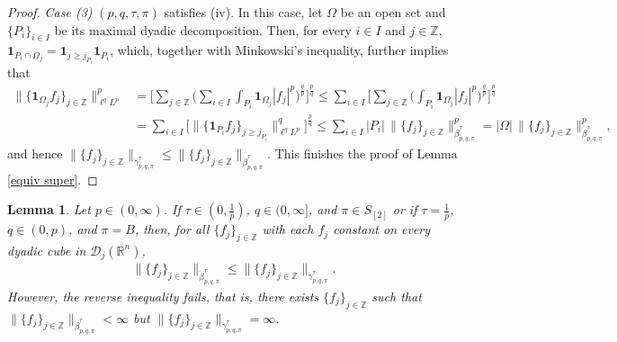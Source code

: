 \documentclass[11pt, reqno]{amsart}
\newtheorem{lemma}[theorem]{Lemma}
\theoremstyle{definition}
\theoremstyle{remark}
\numberwithin{equation}{section}
\newcommand{\R}{\mathbb R}
\newcommand{\Z}{\mathbb Z}
\newcommand{\one}{\mathbf{1}}
\begin{document}
\begin{proof}
\emph{Case (3)} $(p,q,\tau,\pi)$ satisfies (iv).
In this case, let $\Omega$ be an open set and
$\{P_i\}_{i\in I}$ be its maximal dyadic decomposition.
Then, for every $i\in I$ and $j\in\mathbb Z$,
$\mathbf 1_{P_i\cap \Omega_j} = \mathbf 1_{j\geq j_{P_i}} \mathbf 1_{P_i}$,
which, together with Minkowski's inequality, further implies that
\begin{align*}
\big\|\{\one_{\Omega_j}f_j\}_{j\in\Z}\big\|_{\ell^qL^p}^p
&= \Bigg[ \sum_{j\in\mathbb Z} \Bigg( \sum_{i\in I} \int_{P_i}
\one_{\Omega_j} |f_j|^p \Bigg)^{\frac qp} \Bigg]^{\frac pq}
\leq  \sum_{i\in I} \Bigg[ \sum_{j\in\mathbb Z} \Bigg( \int_{P_i}
\one_{\Omega_j} |f_j|^p \Bigg)^{\frac qp} \Bigg]^{\frac pq}  \\
&= \sum_{i\in I} \Big[ \big\|\{\one_{P_i} f_j\}_{j\geq j_{P_i}}
\big\|_{\ell^q L^p}^q \Big]^{\frac pq}
\leq \sum_{i\in I} |P_i| \, \|\{f_j\}_{j\in\mathbb Z}\|_{\dot\beta^\tau_{p,q,\pi}}^p
=|\Omega| \, \|\{f_j\}_{j\in\mathbb Z}\|_{\dot\beta^\tau_{p,q,\pi}}^p,
\end{align*}
and hence $\|\{f_j\}_{j\in\mathbb Z}\|_{\dot\gamma^\tau_{p,q,\pi}}\leq \|\{f_j\}_{j\in\mathbb Z}\|_{\dot\beta^\tau_{p,q,\pi}}$.
This finishes the proof of Lemma \ref{equiv super}.
\end{proof}

\begin{lemma} \label{equiv sub}
Let $p\in(0,\infty)$.
If $\tau\in(0,\frac1p)$, $q\in(0,\infty]$, and $\pi\in S_{[2]}$
or if $\tau=\frac1p$, $q\in(0,p)$, and $\pi=B$,
then, for all $\{f_j\}_{j\in\mathbb Z}$ with each $f_j$ constant on every dyadic cube in $\mathscr D_j(\R^n)$,
\begin{align*}
\|\{f_j\}_{j\in\mathbb Z}\|_{\dot\beta^\tau_{p,q,\pi}}
\leq\|\{f_j\}_{j\in\mathbb Z}\|_{\dot\gamma^\tau_{p,q,\pi}}.
\end{align*}
However, the reverse inequality fails, that is,
there exists $\{f_j\}_{j\in\mathbb Z}$ such that
$\|\{f_j\}_{j\in\mathbb Z}\|_{\dot\beta^\tau_{p,q,\pi}}<\infty$
but $\|\{f_j\}_{j\in\mathbb Z}\|_{\dot\gamma^\tau_{p,q,\pi}}=\infty$.
\end{lemma}
\end{document}
